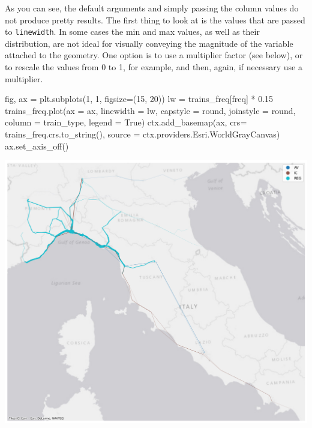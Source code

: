 \documentclass[
  letterpaper,
  DIV=11,
  numbers=noendperiod]{scrreprt}
\newenvironment{Shaded}{\begin{snugshade}}{\end{snugshade}}
\newcommand{\DecValTok}[1]{\textcolor[rgb]{0.68,0.00,0.00}{#1}}
\newcommand{\FloatTok}[1]{\textcolor[rgb]{0.68,0.00,0.00}{#1}}
\newcommand{\NormalTok}[1]{\textcolor[rgb]{0.00,0.23,0.31}{#1}}
\newcommand{\OperatorTok}[1]{\textcolor[rgb]{0.37,0.37,0.37}{#1}}
\newcommand{\StringTok}[1]{\textcolor[rgb]{0.13,0.47,0.30}{#1}}
\newcommand{\VariableTok}[1]{\textcolor[rgb]{0.07,0.07,0.07}{#1}}
\begin{document}
As you can see, the default arguments and simply passing the column
values do not produce pretty results. The first thing to look at is the
values that are passed to \texttt{linewidth}. In some cases the min and
max values, as well as their distribution, are not ideal for visually
conveying the magnitude of the variable attached to the geometry. One
option is to use a multiplier factor (see below), or to rescale the
values from 0 to 1, for example, and then, again, if necessary use a
multiplier.

\begin{Shaded}
\begin{Highlighting}[]
\NormalTok{fig, ax }\OperatorTok{=}\NormalTok{ plt.subplots(}\DecValTok{1}\NormalTok{, }\DecValTok{1}\NormalTok{, figsize}\OperatorTok{=}\NormalTok{(}\DecValTok{15}\NormalTok{, }\DecValTok{20}\NormalTok{))}
\NormalTok{lw }\OperatorTok{=}\NormalTok{ trains\_freq[}\StringTok{\textquotesingle{}freq\textquotesingle{}}\NormalTok{] }\OperatorTok{*} \FloatTok{0.15}
\NormalTok{trains\_freq.plot(ax }\OperatorTok{=}\NormalTok{ ax, linewidth }\OperatorTok{=}\NormalTok{ lw, capstyle }\OperatorTok{=} \StringTok{\textquotesingle{}round\textquotesingle{}}\NormalTok{, joinstyle }\OperatorTok{=} \StringTok{\textquotesingle{}round\textquotesingle{}}\NormalTok{, column }\OperatorTok{=} \StringTok{\textquotesingle{}train\_type\textquotesingle{}}\NormalTok{, legend }\OperatorTok{=} \VariableTok{True}\NormalTok{)}
\NormalTok{ctx.add\_basemap(ax, crs}\OperatorTok{=}\NormalTok{ trains\_freq.crs.to\_string(), source }\OperatorTok{=}\NormalTok{ ctx.providers.Esri.WorldGrayCanvas)}
\NormalTok{ax.set\_axis\_off()}
\end{Highlighting}
\end{Shaded}

\includegraphics{labs/w02_maps_files/figure-pdf/cell-56-output-1.png}
\end{document}
